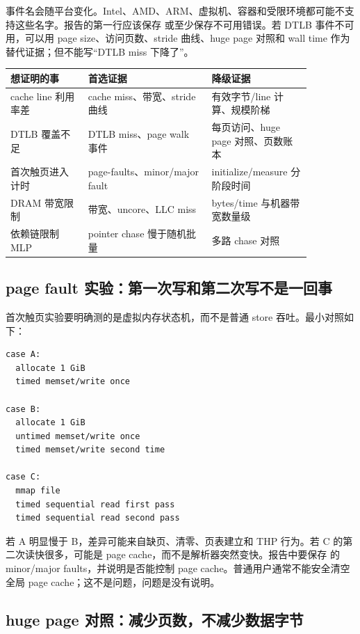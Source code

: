 事件名会随平台变化。Intel、AMD、ARM、虚拟机、容器和受限环境都可能不支持这些名字。报告的第一行应该保存  或至少保存不可用错误。若 DTLB 事件不可用，可以用 page size、访问页数、stride 曲线、huge page 对照和 wall time 作为替代证据；但不能写“DTLB miss 下降了”。

\begin{center}
\small
\begin{tabular}{p{0.22\linewidth}p{0.35\linewidth}p{0.29\linewidth}}
\toprule
想证明的事 & 首选证据 & 降级证据 \\
\midrule
cache line 利用率差 & cache miss、带宽、stride 曲线 & 有效字节/line 计算、规模阶梯 \\
DTLB 覆盖不足 & DTLB miss、page walk 事件 & 每页访问、huge page 对照、页数账本 \\
首次触页进入计时 & page-faults、minor/major fault & initialize/measure 分阶段时间 \\
DRAM 带宽限制 & 带宽、uncore、LLC miss & bytes/time 与机器带宽数量级 \\
依赖链限制 MLP & pointer chase 慢于随机批量 & 多路 chase 对照 \\
\bottomrule
\end{tabular}
\end{center}

\subsection{page fault 实验：第一次写和第二次写不是一回事}

首次触页实验要明确测的是虚拟内存状态机，而不是普通 store 吞吐。最小对照如下：

\begin{lstlisting}[numbers=none,caption={首次触页对照}]
case A:
  allocate 1 GiB
  timed memset/write once

case B:
  allocate 1 GiB
  untimed memset/write once
  timed memset/write second time

case C:
  mmap file
  timed sequential read first pass
  timed sequential read second pass
\end{lstlisting}

若 A 明显慢于 B，差异可能来自缺页、清零、页表建立和 THP 行为。若 C 的第二次读快很多，可能是 page cache，而不是解析器突然变快。报告中要保存  的 minor/major faults，并说明是否能控制 page cache。普通用户通常不能安全清空全局 page cache；这不是问题，问题是没有说明。

\subsection{huge page 对照：减少页数，不减少数据字节}

